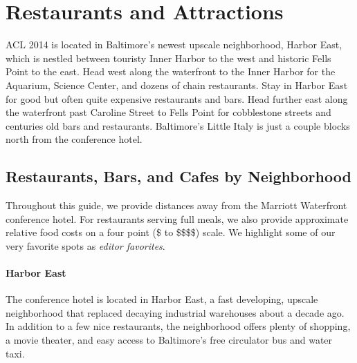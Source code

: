 \section[Restaurants and Attractions]{Restaurants and Attractions}
\thispagestyle{emptyheader}

ACL 2014 is located in Baltimore's newest upscale neighborhood, Harbor
East, which is nestled between touristy Inner Harbor to the west and
historic Fells Point to the east. Head west along the waterfront to
the Inner Harbor for the Aquarium, Science Center, and dozens of chain
restaurants. Stay in Harbor East for good but often quite expensive
restaurants and bars. Head further east along the waterfront past
Caroline Street to Fells Point for cobblestone streets and centuries
old bars and restaurants. Baltimore's Little Italy is just a couple
blocks north from the conference hotel.

\newcommand{\gradstudent}{\$\xspace}
\newcommand{\postdoc}{\$\$\xspace}
\newcommand{\professor}{\$\$\$\xspace}
\newcommand{\industry}{\$\$\$\$\xspace}

\subsection*{Restaurants, Bars, and Cafes by Neighborhood}

Throughout this guide, we provide distances away from the Marriott
Waterfront conference hotel. For restaurants serving full meals, we
also provide approximate relative food costs on a four point (\gradstudent to
\industry) scale. We highlight some of our very favorite spots as {\it
  editor favorites}.

\paragraph*{Harbor East}
The conference hotel is located in Harbor East, a fast developing, upscale neighborhood that replaced decaying industrial warehouses about a decade ago. In addition to a few nice restaurants, the neighborhood offers plenty of shopping, a movie theater, and easy access to Baltimore's free circulator bus and water taxi. 

